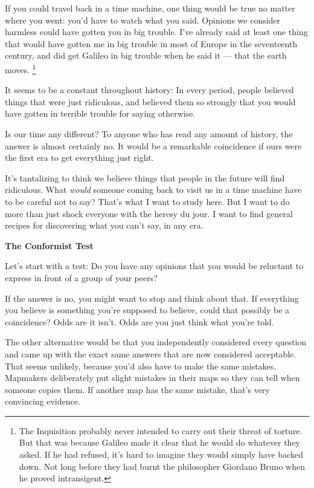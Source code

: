 \documentclass[12pt]{book}
\begin{document}
If you could travel back in a time machine, one thing would be true no
matter where you went: you'd have to watch what you said. Opinions we
consider harmless could have gotten you in big trouble. I've already
said at least one thing that would have gotten me in big trouble in most
of Europe in the seventeenth century, and did get Galileo in big trouble
when he said it --- that the earth moves. \footnote{The Inquisition probably never intended to carry out their
threat of torture. But that was because Galileo made it clear that he
would do whatever they asked. If he had refused, it's hard to imagine
they would simply have backed down. Not long before they had burnt the
philosopher Giordano Bruno when he proved intransigent.}

It seems to be a constant throughout history: In every period, people
believed things that were just ridiculous, and believed them so strongly
that you would have gotten in terrible trouble for saying otherwise.

Is our time any different? To anyone who has read any amount of history,
the answer is almost certainly no. It would be a remarkable coincidence
if ours were the first era to get everything just right.

It's tantalizing to think we believe things that people in the future
will find ridiculous. What \emph{would} someone coming back to visit us
in a time machine have to be careful not to say? That's what I want to
study here. But I want to do more than just shock everyone with the
heresy du jour. I want to find general recipes for discovering what you
can't say, in any era.

\textbf{The Conformist Test}

Let's start with a test: Do you have any opinions that you would be
reluctant to express in front of a group of your peers?

If the answer is no, you might want to stop and think about that. If
everything you believe is something you're supposed to believe, could
that possibly be a coincidence? Odds are it isn't. Odds are you just
think what you're told.

The other alternative would be that you independently considered every
question and came up with the exact same answers that are now considered
acceptable. That seems unlikely, because you'd also have to make the
same mistakes. Mapmakers deliberately put slight mistakes in their maps
so they can tell when someone copies them. If another map has the same
mistake, that's very convincing evidence.
\end{document}
